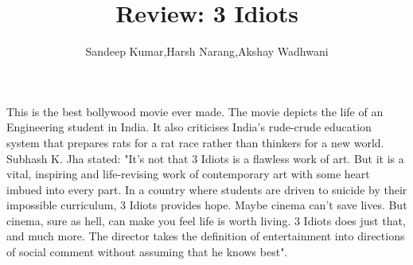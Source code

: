 \documentclass{article}
\title{Review: 3 Idiots}
\author{Sandeep Kumar,Harsh Narang,Akshay Wadhwani}
\begin{document}
\maketitle
This is the best bollywood movie ever made. The movie depicts the life of an Engineering student in India. It also criticises India's rude-crude education system that prepares rats for a rat race rather than thinkers for a new world.\\
Subhash K. Jha stated: "It's not that 3 Idiots is a flawless work of art. But it is a vital, inspiring and life-revising work of contemporary art with some heart imbued into every part. In a country where students are driven to suicide by their impossible curriculum, 3 Idiots provides hope. Maybe cinema can't save lives. But cinema, sure as hell, can make you feel life is worth living. 3 Idiots does just that, and much more. The director takes the definition of entertainment into directions of social comment without assuming that he knows best".\\
\end{document}

